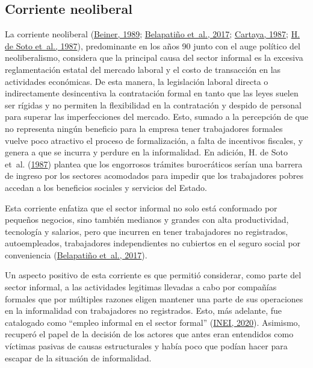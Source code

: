 \documentclass[
  letterpaper,
  12pt,
  oneside,
  spanish,
  doublespacing,
  headsepline,
  parskip]{MastersDoctoralThesis}
\begin{document}
\hypertarget{corriente-neoliberal}{%
\subsection{Corriente neoliberal}\label{corriente-neoliberal}}

La corriente neoliberal (\protect\hyperlink{ref-beiner1989}{Beiner,
1989}; \protect\hyperlink{ref-belapatiuxf1o2017}{Belapatiño et~al.,
2017}; \protect\hyperlink{ref-cartaya1987}{Cartaya, 1987};
\protect\hyperlink{ref-desoto1987}{H. de Soto et~al., 1987}),
predominante en los años 90 junto con el auge político del
neoliberalismo, considera que la principal causa del sector informal es
la excesiva reglamentación estatal del mercado laboral y el costo de
transacción en las actividades económicas. De esta manera, la
legislación laboral directa o indirectamente desincentiva la
contratación formal en tanto que las leyes suelen ser rígidas y no
permiten la flexibilidad en la contratación y despido de personal para
superar las imperfecciones del mercado. Esto, sumado a la percepción de
que no representa ningún beneficio para la empresa tener trabajadores
formales vuelve poco atractivo el proceso de formalización, a falta de
incentivos fiscales, y genera a que se incurra y perdure en la
informalidad. En adición, H. de Soto et~al.
(\protect\hyperlink{ref-desoto1987}{1987}) plantea que los engorrosos
trámites burocráticos serían una barrera de ingreso por los sectores
acomodados para impedir que los trabajadores pobres accedan a los
beneficios sociales y servicios del Estado.

Esta corriente enfatiza que el sector informal no solo está conformado
por pequeños negocios, sino también medianos y grandes con alta
productividad, tecnología y salarios, pero que incurren en tener
trabajadores no registrados, autoempleados, trabajadores independientes
no cubiertos en el seguro social por conveniencia
(\protect\hyperlink{ref-belapatiuxf1o2017}{Belapatiño et~al., 2017}).

Un aspecto positivo de esta corriente es que permitió considerar, como
parte del sector informal, a las actividades legitimas llevadas a cabo
por compañías formales que por múltiples razones eligen mantener una
parte de sus operaciones en la informalidad con trabajadores no
registrados. Esto, más adelante, fue catalogado como ``empleo informal
en el sector formal'' (\protect\hyperlink{ref-inei2020}{INEI, 2020}).
Asimismo, recuperó el papel de la decisión de los actores que antes eran
entendidos como víctimas pasivas de causas estructurales y había poco
que podían hacer para escapar de la situación de informalidad.
\end{document}
